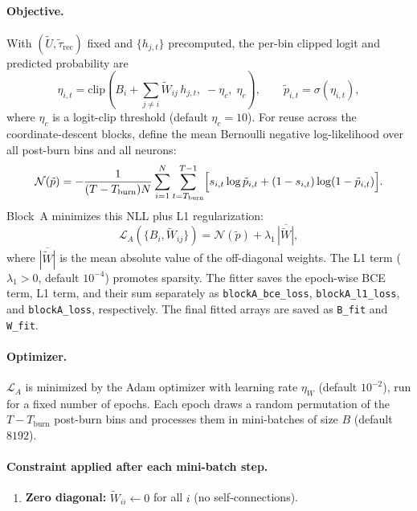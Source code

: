 \documentclass[11pt]{article}
\begin{document}
\paragraph{Objective.}
With $(\tilde{U},\tilde{\tau}_\text{rec})$ fixed and $\{h_{j,t}\}$ precomputed,
the per-bin clipped logit and predicted probability are
\begin{equation}
    \eta_{i,t} = \mathrm{clip}\!\left(
        B_i + \sum_{j\neq i} \tilde{W}_{ij}\,h_{j,t},\; -\eta_c,\; \eta_c
    \right),
    \qquad
    \tilde{p}_{i,t} = \sigma(\eta_{i,t}),
    \label{eq:blockA_logit}
\end{equation}
where $\eta_c$ is a logit-clip threshold (default $\eta_c=10$).
For reuse across the coordinate-descent blocks, define the mean Bernoulli
negative log-likelihood over all post-burn bins and all neurons:
\begin{equation}
\mathcal{N}(\tilde{p})
=
-\frac{1}{(T-T_\text{burn})N}
\sum_{i=1}^{N}\sum_{t=T_\text{burn}}^{T-1}
\Bigl[s_{i,t}\log\tilde{p}_{i,t}+(1-s_{i,t})\log(1-\tilde{p}_{i,t})\Bigr].
\label{eq:mean_bernoulli_nll}
\end{equation}
Block~A minimizes this NLL plus L1 regularization:
\begin{equation}
\mathcal{L}_A(\{B_i,\tilde{W}_{ij}\})
=
\mathcal{N}(\tilde{p})
+\lambda_1\,\overline{|\tilde{W}|},
\label{eq:blockA_loss}
\end{equation}
where $\overline{|\tilde{W}|}$ is the mean absolute value of the off-diagonal
weights. The L1 term ($\lambda_1>0$, default $10^{-4}$) promotes sparsity.
The fitter saves the epoch-wise BCE term, L1 term, and their sum separately as
\texttt{blockA\_bce\_loss}, \texttt{blockA\_l1\_loss}, and
\texttt{blockA\_loss}, respectively. The final fitted arrays are saved as
\texttt{B\_fit} and \texttt{W\_fit}.

\paragraph{Optimizer.}
$\mathcal{L}_A$ is minimized by the Adam optimizer with learning rate
$\eta_W$ (default $10^{-2}$), run for a fixed number of epochs.
Each epoch draws a random permutation of the $T-T_\text{burn}$ post-burn bins
and processes them in mini-batches of size $B$ (default $8192$).

\paragraph{Constraint applied after each mini-batch step.}
\begin{enumerate}
    \item \textbf{Zero diagonal:} $\tilde{W}_{ii}\leftarrow 0$ for all $i$
          (no self-connections).
\end{enumerate}
\end{document}
